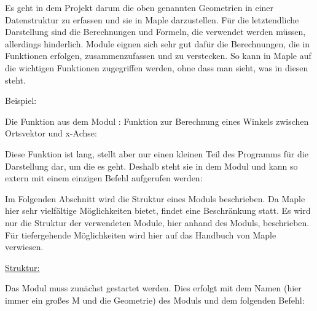 Es geht in dem Projekt darum die oben genannten Geometrien in einer Datenstruktur zu erfassen und sie in Maple darzustellen. Für die letztendliche Darstellung sind die Berechnungen und Formeln, die verwendet werden müssen, allerdings hinderlich. Module eignen sich sehr gut dafür die Berechnungen, die in Funktionen erfolgen, zusammenzufassen und zu verstecken. So kann in Maple auf die wichtigen Funktionen zugegriffen werden, ohne dass man sieht, was in diesen steht. \medskip

Beispiel:

Die Funktion  aus dem Modul : Funktion zur Berechnung eines Winkels zwischen Ortsvektor und x-Achse:

\begin{alltt}
\end{alltt}

Diese Funktion ist lang, stellt aber nur einen kleinen Teil des Programms für die Darstellung dar, um die es geht. Deshalb steht sie in dem Modul und kann so extern mit einem einzigen Befehl aufgerufen werden: 

\medskip


\bigskip

Im Folgenden Abschnitt wird die Struktur eines Moduls beschrieben. Da Maple hier sehr vielfältige  Möglichkeiten bietet, findet eine Beschränkung statt. Es wird nur die Struktur der verwendeten Module, hier anhand des Moduls, beschrieben. Für tiefergehende Möglichkeiten wird hier auf das Handbuch von Maple \cite{Wat:2017a} verwiesen.

\bigskip

\underline{Struktur:}

\bigskip

Das Modul muss zunächst gestartet werden. Dies erfolgt mit dem Namen (hier immer ein großes M und die Geometrie) des Moduls und dem folgenden Befehl:

